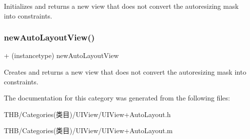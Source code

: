 Initializes and returns a new view that does not convert the autoresizing mask into constraints. \mbox{\label{category_u_i_view_07_auto_layout_08_a8d17d4e49ad82545614adadf39a7d09d}} 
\subsubsection{\texorpdfstring{new\+Auto\+Layout\+View()}{newAutoLayoutView()}}
{\footnotesize\ttfamily + (instancetype) new\+Auto\+Layout\+View \begin{DoxyParamCaption}{ }\end{DoxyParamCaption}}

Creates and returns a new view that does not convert the autoresizing mask into constraints. 

The documentation for this category was generated from the following files\+:\begin{DoxyCompactItemize}
\item 
T\+H\+B/\+Categories(类目)/\+U\+I\+View/U\+I\+View+\+Auto\+Layout.\+h\item 
T\+H\+B/\+Categories(类目)/\+U\+I\+View/U\+I\+View+\+Auto\+Layout.\+m\end{DoxyCompactItemize}
